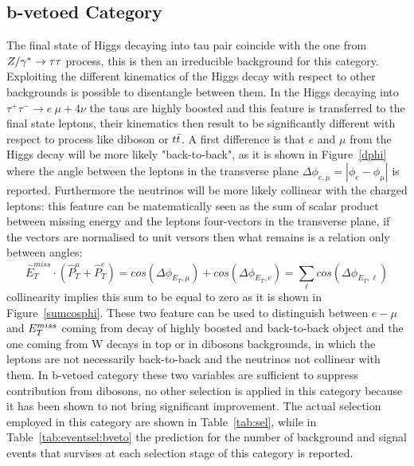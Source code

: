 \subsection{b-vetoed Category}\label{sec:veto}

The final state of Higgs decaying into tau pair coincide with the one from  $Z/\gamma^*\rightarrow \tau\tau$  process, this is then an irreducible 
background for this category. Exploiting the different kinematics of the Higgs decay with respect to 
other backgrounds is possible to disentangle
between them. In the Higgs decaying into $\tau^{+} \tau^{-} \rightarrow e ~ \mu + 4\nu$ the taus are highly boosted
and this feature is transferred to the final state leptons, their kinematics then result to be  significantly different 
with respect to process like diboson or $t\bar{t}$. A first difference is that  $e$ and $\mu$ from the Higgs decay 
will be more likely "back-to-back",
as it is shown in Figure~\ref{dphi} where the angle between the leptons in the transverse plane 
$\Delta\phi_{e,\mu} = |\phi_{e} - \phi_{\mu}|$ 
is reported.  Furthermore the neutrinos will be more likely collinear with the charged leptons:
this feature can be matematically seen as the sum of scalar product between missing energy and the leptons four-vectors in the
transverse plane, if the vectors are normalised to unit versors then what remains is a relation only between angles:
$$ \hat{E}_{T}^{miss} \cdot ( \hat{P}_{T}^{\mu} + \hat{P}_{T}^{e} ) = cos(\Delta\phi_{E_{T},\mu}) 
+ cos(\Delta\phi_{E_{T},e}) = \sum_\ell cos(\Delta\phi_{E_{T},\ell}) $$
collinearity implies this sum to be equal to zero as it is shown in Figure~\ref{sumcosphi}. 
These two feature can be used to distinguish between $e-\mu$ and $E_{T}^{miss}$ coming from decay of highly 
boosted and back-to-back object and the one coming from W decays in top or in dibosons backgrounds,
in which the leptons are not necessarily back-to-back and the neutrinos not collinear with them.
In b-vetoed category these two variables are sufficient to suppress contribution from dibosons,
no other selection is applied in this category because it has been shown to not bring significant improvement.
The actual selection employed in this category are shown in Table~\ref{tab:sel}, while in Table~\ref{tab:eventsel:bveto}
the prediction for the number of background and signal events that survises at 
each selection stage of this category is reported.


